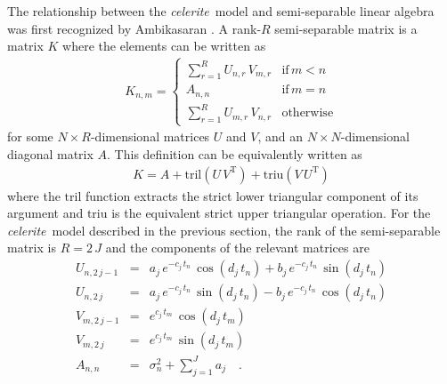 \documentclass[manuscript, letterpaper]{aastex6}
\newcommand{\celeriteterm}{\emph{celerite}}
\newcommand{\eqlabel}[1]{\label{eq:#1}}
\newcommand{\T}{\ensuremath{\mathrm{T}}}
\begin{document}
The relationship between the \celeriteterm\ model and semi-separable linear
algebra was first recognized by Ambikasaran \citep{Ambikasaran:2015}.
A rank-$R$ semi-separable matrix is a matrix $K$ where the elements can be
written as
\begin{eqnarray}
K_{n,m} = \left\{\begin{array}{ll}
    \sum_{r=1}^R U_{n,r}\,V_{m,r} & \mathrm{if}\,m<n \\
    A_{n,n} & \mathrm{if}\,m=n \\
    \sum_{r=1}^R U_{m,r}\,V_{n,r} & \mathrm{otherwise}
\end{array}\right.
\end{eqnarray}
for some $N \times R$-dimensional matrices $U$ and $V$, and an $N \times
N$-dimensional diagonal matrix $A$.
This definition can be equivalently written as
\begin{eqnarray}\eqlabel{semi-sep}
K = A + \mathrm{tril}(U\,V^\T) + \mathrm{triu}(V\,U^\T)
\end{eqnarray}
where the $\mathrm{tril}$ function extracts the strict lower triangular
component of its argument and $\mathrm{triu}$ is the equivalent strict upper
triangular operation.
For the \celeriteterm\ model described in the previous section, the rank of
the semi-separable matrix is $R = 2\,J$ and the components of the relevant
matrices are
\begin{eqnarray}
U_{n,2\,j-1} &=& a_j\,e^{-c_j\,t_n}\,\cos(d_j\,t_n) +
    b_j\,e^{-c_j\,t_n}\,\sin(d_j\,t_n) \\
U_{n,2\,j} &=& a_j\,e^{-c_j\,t_n}\,\sin(d_j\,t_n) -
    b_j\,e^{-c_j\,t_n}\,\cos(d_j\,t_n) \\
V_{m,2\,j-1} &=& e^{c_j\,t_m}\,\cos(d_j\,t_m) \\
V_{m,2\,j} &=& e^{c_j\,t_m}\,\sin(d_j\,t_m) \\
A_{n,n} &=& \sigma_n^2 + \sum_{j=1}^J a_j \quad.
\end{eqnarray}
\end{document}
